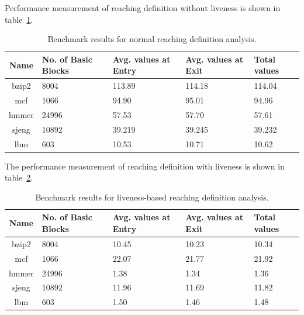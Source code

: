 \documentclass[11pt,a4paper,openright]{report}
\begin{document}
Performance measurement of reaching definition without liveness is shown in table~\ref{tab:performance_without_l}.
\begin{table}[H]
  \begin{center}
    \begin{tabular}{|c|p{1.5cm}|p{2cm}|p{2cm}|p{2cm}|}
    \hline
      Name & No. of Basic Blocks & Avg. values at Entry & Avg. values at Exit & Total values \\
      \hline
   	  bzip2 & 8004 & 113.89 & 114.18 & 114.04 \\ \hline
   	  mcf & 1066 & 94.90 & 95.01 & 94.96 \\ \hline
   	  hmmer & 24996 & 57.53 & 57.70  & 57.61 \\ \hline
   	  sjeng & 10892 & 39.219 & 39.245 & 39.232 \\ \hline
   	  lbm & 603 & 10.53 & 10.71 & 10.62\\ \hline
   	  
	\hline
    \end{tabular}
    \caption{Benchmark results for normal reaching definition analysis.}
      \label{tab:performance_without_l}
  \end{center}
\end{table}

The performance measurement of reaching definition with liveness is shown in table~\ref{tab:performance_with_l}.
\begin{table}[H]
  \begin{center}
    \begin{tabular}{|c|p{1.5cm}|p{2cm}|p{2cm}|p{2cm}|}
    \hline
      Name & No. of Basic Blocks & Avg. values at Entry & Avg. values at Exit & Total values\\
      \hline
   	  bzip2 & 8004 & 10.45 & 10.23 & 10.34 \\ \hline
   	  mcf & 1066 &  22.07 & 21.77 & 21.92 \\ \hline
   	  hmmer & 24996 & 1.38 & 1.34  & 1.36 \\ \hline
   	  sjeng & 10892 & 11.96 & 11.69 & 11.82 \\ \hline
   	  lbm & 603 & 1.50 & 1.46 & 1.48\\ \hline
   	  
	\hline
    \end{tabular}
    \caption{Benchmark results for liveness-based reaching definition analysis.}
      \label{tab:performance_with_l}
  \end{center}
\end{table}
\end{document}
